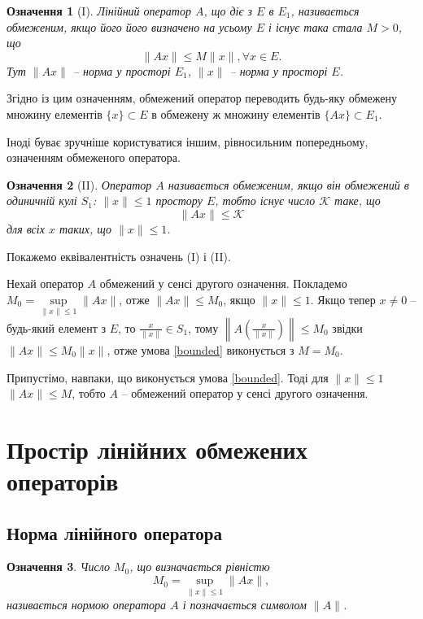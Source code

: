 \documentclass[14pt,twoside]{extreport}
\theoremstyle{mystyle}
\newtheorem{dfn}{Означення}
\numberwithin{equation}{chapter}
\begin{document}
\begin{dfn}[I]
	Лінійний оператор $A$, що діє з $E$ в $E_1$, називається обмеженим, якщо його його визначено на усьому $E$ і існує така стала $M > 0$, що
	\begin{equation}\label{bounded}
	\|Ax\| \leqslant M \|x\|, \forall x\in E.
	\end{equation}
	Тут $\|Ax\|$ -- норма у просторі $E_1$, $\|x\|$ -- норма у просторі $E$.
\end{dfn}

Згідно із цим означенням, обмежений оператор переводить будь-яку обмежену множину елементів $\{x\}\subset E$ в обмежену ж множину елементів $\{Ax\}\subset E_1$.

Іноді буває зручніше користуватися іншим, рівносильним попередньому, означенням обмеженого оператора.

\begin{dfn}[II]
	Оператор $A$ називається обмеженим, якщо він обмежений в одиничній кулі $S_1$: $\|x\|\leqslant 1$ простору $E$, тобто існує число $\mathcal{K}$ таке, що
	\begin{equation}
	\|Ax\|\leqslant\mathcal{K}
	\end{equation}
	для всіх $x$ таких, що $\|x\| \leqslant 1$.
\end{dfn}

Покажемо еквівалентність означень (I) і (II).

Нехай оператор $A$ обмежений у сенсі другого означення. Покладемо $M_0 = \sup\limits_{\|x\|\leqslant 1} \|Ax\|$, отже $\|Ax\| \leqslant M_0$, якщо $\|x\|\leqslant 1$. Якщо тепер $x\neq 0$ -- будь-який елемент з $E$, то $\frac{x}{\|x\|}\in S_1$, тому $\left\|A\left(\frac{x}{\|x\|}\right)\right\|\leqslant M_0$ звідки $\|Ax\| \leqslant M_0 \|x\|$, отже умова \eqref{bounded} виконується з $M=M_0$.

Припустімо, навпаки, що виконується умова \eqref{bounded}. Тоді для $\|x\|\leqslant 1$ $\|Ax\|\leqslant M$, тобто $A$ -- обмежений оператор у сенсі другого означення.

\section{Простір лінійних обмежених операторів}

\subsection{Норма лінійного оператора}
\begin{dfn}
 Число $M_0$, що визначається рівністю
\begin{equation}
 M_0 = \sup_{\|x\|\leqslant 1}\|Ax\|,
\end{equation}
 називається нормою оператора $A$ і позначається символом $\|A\|$.
\end{dfn}
\end{document}
